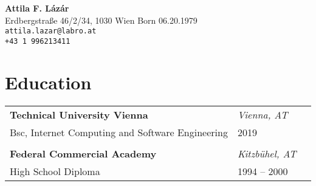 \documentclass[letterpaper,11pt]{article}
\begin{document}

\setlength{\leftmargini}{2em}
\renewcommand{\labelitemi}{}



 \Huge  \textbf{Attila F. L\'{a}z\'{a}r} \\
        \normalsize Erdbergstra\ss{}e 46/2/34, 1030 Wien  \hfill  Born 06.20.1979\\
		\hfill \texttt{attila.lazar@labro.at}  \\
		\hfill \texttt{+43 1 996213411} \\
        \par \normalsize \normalfont


\section{\bf Education}
        	
\vspace{-1em}
\begin{longtable}{  L{0.70\textwidth}  R{0.25\textwidth}  R{0.05\textwidth }} 
		\textbf{Technical University Vienna} &  \textit{Vienna, AT} \\

	Bsc, Internet Computing and Software Engineering & 2019 \\ 
\vspace{1pt}\\
		\textbf{Federal Commercial Academy} &  \textit{Kitzb\"{u}hel, AT} \\

	High School Diploma & 1994 -- 2000 \\ 
%

\end{longtable}
\end{document}

